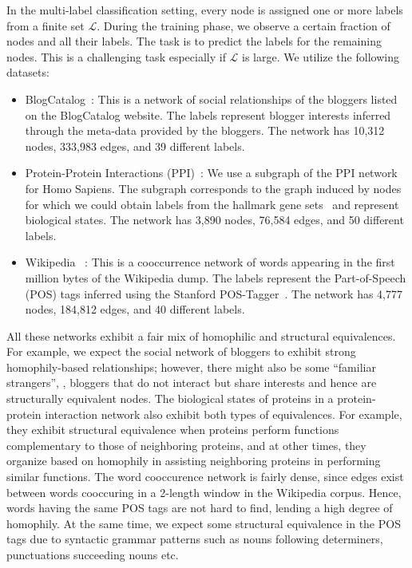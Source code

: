 In the multi-label classification setting, every node is assigned one or more labels from a finite set $\mathcal{L}$. During the training phase, we observe a certain fraction of nodes and all their labels. The task is to predict the labels for the remaining nodes. This is a challenging task especially if $\mathcal{L}$ is large. 
We utilize the following datasets:
\begin{itemize}[noitemsep,nolistsep]
	\item BlogCatalog~\cite{asu}: This is a network of social relationships of the bloggers listed on the BlogCatalog website. The labels represent blogger interests inferred through the meta-data provided by the bloggers. The network has 10,312 nodes, 333,983 edges, and 39 different labels.

	\item Protein-Protein Interactions (PPI)~\cite{biogrid}: We use a subgraph of the PPI network for Homo Sapiens. The subgraph corresponds to the graph induced by nodes for which we could obtain labels from the hallmark gene sets~\cite{msigdb} and represent biological states. 
	The network has 3,890 nodes, 76,584 edges, and 50 different labels.

	\item Wikipedia ~\cite{wiki-pos}: This is a cooccurrence network of words appearing in the first million bytes of the Wikipedia dump. The labels represent the Part-of-Speech (POS) tags inferred using the Stanford POS-Tagger~\cite{postagger}. The network has 4,777 nodes, 184,812 edges, and 40 different labels.
\end{itemize}

All these networks exhibit a fair mix of homophilic and structural equivalences. For example, we expect the social network of bloggers to exhibit strong homophily-based relationships; however, there might also be some ``familiar strangers'', \ie, bloggers that do not interact but share interests and hence are structurally equivalent nodes.
The biological states of proteins in a protein-protein interaction network also exhibit both types of equivalences. For example, they exhibit structural equivalence when proteins perform functions complementary to those of neighboring proteins, and at other times, they organize based on homophily in assisting neighboring proteins in performing similar functions. The word cooccurence network is fairly dense, since edges exist between words cooccuring in a 2-length window in the Wikipedia corpus. Hence, words having the same POS tags are not hard to find, lending a high degree of homophily. At the same time, we expect some structural equivalence in the POS tags due to syntactic grammar patterns such as nouns following determiners, punctuations succeeding nouns etc.

